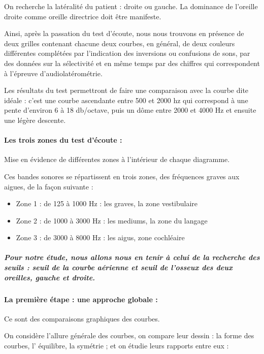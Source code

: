 On recherche la latéralité du patient : droite ou gauche. La dominance
de l'oreille droite comme oreille directrice doit être manifeste.

Ainsi, après la passation du test d\textquoteright écoute, nous nous
trouvons en présence de deux grilles contenant chacune deux courbes,
en général, de deux couleurs différentes complétées par l'indication
des inversions ou confusions de sons, par des données sur la sélectivité
et en même temps par des chiffres qui correspondent à l'épreuve d'audiolatérométrie.

Les résultats du test permettront de faire une comparaison avec la
courbe dite idéale : c'est une courbe ascendante entre 500 et 2000
hz qui correspond à une pente d\textquoteright environ 6 à 18 db/octave,
puis un dôme entre 2000 et 4000 Hz et ensuite une légère descente. 

\paragraph{Les trois zones du test d'écoute : }

Mise en évidence de différentes zones à l\textquoteright intérieur
de chaque diagramme. 

Ces bandes sonores se répartissent en trois zones, des fréquences
graves aux aigues, de la façon suivante :
\begin{itemize}
\item Zone 1 : de 125 à 1000 Hz : les graves, la zone vestibulaire
\item Zone 2 : de 1000 à 3000 Hz : les mediums, la zone du langage
\item Zone 3 : de 3000 à 8000 Hz : les aigus, zone cochléaire
\end{itemize}

\subparagraph*{Pour notre étude, nous allons nous en tenir à celui de la recherche
des seuils : seuil de la courbe aérienne et seuil de l'osseux des
deux oreilles, gauche et droite.}



\paragraph{La première étape : une approche globale : }

Ce sont des comparaisons graphiques des courbes. 

On considère l'allure générale des courbes, on compare leur dessin
: la forme des courbes, l' équilibre, la symétrie ; et on étudie leurs
rapports entre eux : 

